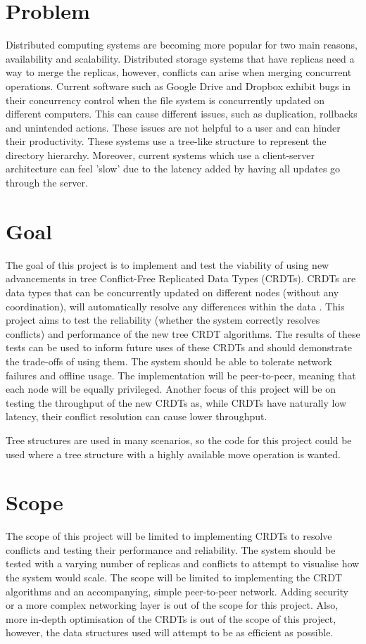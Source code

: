 \documentclass[12pt]{report}
\begin{document}
\section{Problem}
Distributed computing systems are becoming more popular for two main reasons, availability and scalability. Distributed storage systems that have replicas need a way to merge the replicas, however, conflicts can arise when merging concurrent operations. Current software such as Google Drive and Dropbox exhibit bugs in their concurrency control when the file system is concurrently updated on different computers. This can cause different issues, such as duplication, rollbacks and unintended actions. These issues are not helpful to a user and can hinder their productivity. These systems use a tree-like structure to represent the directory hierarchy. Moreover, current systems which use a client-server architecture can feel 'slow' due to the latency added by having all updates go through the server.

\section{Goal}
The goal of this project is to implement and test the viability of using new advancements in tree Conflict-Free Replicated Data Types (CRDTs). CRDTs are data types that can be concurrently updated on different nodes (without any coordination), will automatically resolve any differences within the data \cite{10.1007/978-3-642-24550-3_29}. This project aims to test the reliability (whether the system correctly resolves conflicts) and performance of the new tree CRDT algorithms. The results of these tests can be used to inform future uses of these CRDTs and should demonstrate the trade-offs of using them. The system should be able to tolerate network failures and offline usage. The implementation will be peer-to-peer, meaning that each node will be equally privileged. Another focus of this project will be on testing the throughput of the new CRDTs as, while CRDTs have naturally low latency, their conflict resolution can cause lower throughput. \par
Tree structures are used in many scenarios, so the code for this project could be used where a tree structure with a highly available move operation is wanted.

\section{Scope}
The scope of this project will be limited to implementing CRDTs to resolve conflicts and testing their performance and reliability. The system should be tested with a varying number of replicas and conflicts to attempt to visualise how the system would scale. The scope will be limited to implementing the CRDT algorithms and an accompanying, simple peer-to-peer network. Adding security or a more complex networking layer is out of the scope for this project. Also, more in-depth optimisation of the CRDTs is out of the scope of this project, however, the data structures used will attempt to be as efficient as possible. \par
\end{document}
